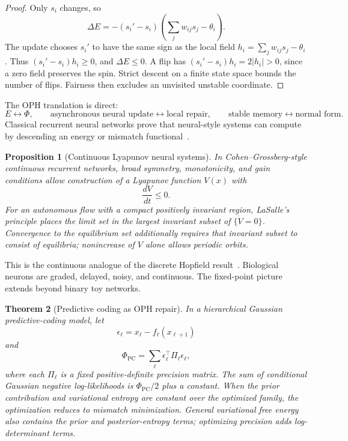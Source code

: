 \documentclass[11pt]{article}
\newtheorem{theorem}{Theorem}[section]
\newtheorem{proposition}[theorem]{Proposition}
\theoremstyle{remark}
\theoremstyle{plain}
\begin{document}
\begin{proof}
Only \(s_i\) changes, so
\[
\Delta E
=
-(s_i'-s_i)
\left(
\sum_jw_{ij}s_j-\theta_i
\right).
\]
The update chooses \(s_i'\) to have the same sign as the local field \(h_i=\sum_jw_{ij}s_j-\theta_i\). Thus \((s_i'-s_i)h_i\ge0\), and \(\Delta E\le0\). A flip has
\((s_i'-s_i)h_i=2|h_i|>0\), since a zero field preserves the spin.
Strict descent on a finite state space bounds the number of flips.
Fairness then excludes an unvisited unstable coordinate.
\end{proof}

The OPH translation is direct:
\[
E\leftrightarrow\Phi,
\qquad
\text{asynchronous neural update}\leftrightarrow\text{local repair},
\qquad
\text{stable memory}\leftrightarrow\text{normal form}.
\]
Classical recurrent neural networks prove that neural-style systems can compute by descending an energy or mismatch functional~\cite{Hopfield1982}.

\begin{proposition}[Continuous Lyapunov neural systems]
In Cohen--Grossberg-style continuous recurrent networks, broad symmetry, monotonicity, and gain conditions allow construction of a Lyapunov function \(V(x)\) with
\[
\frac{dV}{dt}\le0.
\]
For an autonomous flow with a compact positively invariant region, LaSalle's
principle places the limit set in the largest invariant subset of
\(\{\dot V=0\}\). Convergence to the equilibrium set additionally requires
that invariant subset to consist of equilibria; nonincrease of \(V\) alone
allows periodic orbits.
\end{proposition}

This is the continuous analogue of the discrete Hopfield result~\cite{CohenGrossberg1983}. Biological neurons are graded, delayed, noisy, and continuous. The fixed-point picture extends beyond binary toy networks.

\begin{theorem}[Predictive coding as OPH repair]
In a hierarchical Gaussian predictive-coding model, let
\[
\epsilon_\ell=x_\ell-f_\ell(x_{\ell+1})
\]
and
\[
\Phi_{\mathrm{PC}}
=
\sum_\ell \epsilon_\ell^\top\Pi_\ell\epsilon_\ell,
\]
where each \(\Pi_\ell\) is a fixed positive-definite precision matrix.
The sum of conditional Gaussian negative log-likelihoods is
\(\Phi_{\mathrm{PC}}/2\) plus a constant. When the prior contribution and
variational entropy are constant over the optimized family, the optimization reduces to mismatch
minimization. General variational free energy also contains the prior and
posterior-entropy terms; optimizing precision adds log-determinant terms.
\end{theorem}
\end{document}
